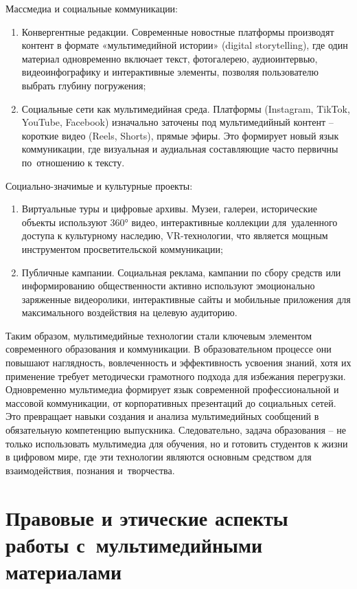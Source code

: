 \documentclass{ou}
\begin{document}
Массмедиа и социальные коммуникации:
\begin{enumerate}[leftmargin=0em, itemindent=3.75em, nosep, label=\arabic*)]
\item Конвергентные редакции. Современные новостные платформы производят контент в формате «мультимедийной истории» (digital storytelling), где один материал одновременно включает текст, фотогалерею, аудиоинтервью, видеоинфографику и интерактивные элементы, позволяя пользователю выбрать глубину погружения;
\item Социальные сети как мультимедийная среда. Платформы (Instagram, TikTok, YouTube, Facebook) изначально заточены под мультимедийный контент -- короткие видео (Reels, Shorts), прямые эфиры. Это формирует новый язык коммуникации, где визуальная и аудиальная составляющие часто первичны по~отношению к тексту.
\end{enumerate}

Социально-значимые и культурные проекты:
\begin{enumerate}[leftmargin=0em, itemindent=3.75em, nosep, label=\arabic*)]
\item Виртуальные туры и цифровые архивы. Музеи, галереи, исторические объекты используют 360° видео, интерактивные коллекции для~удаленного доступа к культурному наследию, VR-технологии, что является мощным инструментом просветительской коммуникации;
\item Публичные кампании. Социальная реклама, кампании по сбору средств или информированию общественности активно используют эмоционально заряженные видеоролики, интерактивные сайты и мобильные приложения для максимального воздействия на целевую аудиторию.
\end{enumerate}

Таким образом, мультимедийные технологии стали ключевым элементом современного образования и коммуникации. В образовательном процессе они повышают наглядность, вовлеченность и эффективность усвоения знаний, хотя их применение требует методически грамотного подхода для избежания перегрузки.
Одновременно мультимедиа формирует язык современной профессиональной и массовой коммуникации, от корпоративных презентаций до социальных сетей. Это превращает навыки создания и анализа мультимедийных сообщений в обязательную компетенцию выпускника.
Следовательно, задача образования -- не только использовать мультимедиа для обучения, но и готовить студентов к жизни в цифровом мире, где эти технологии являются основным средством для взаимодействия, познания и~творчества.
\newpage
\section{Правовые и этические аспекты работы с~мультимедийными материалами}
\end{document}
